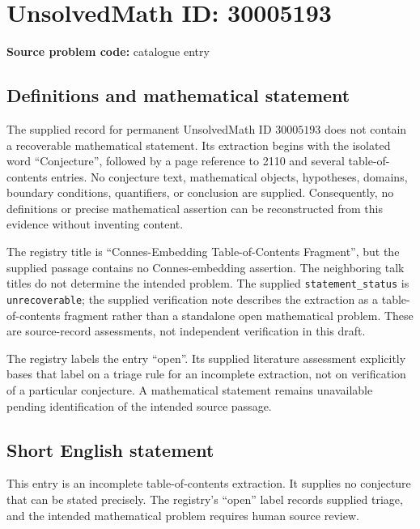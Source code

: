 \documentclass[11pt]{article}
\begin{document}
\section*{UnsolvedMath ID: 30005193}
\textbf{Source problem code:} catalogue entry
\subsection{Definitions and mathematical statement}
The supplied record for permanent UnsolvedMath ID \(30005193\) does not contain a recoverable mathematical statement. Its extraction begins with the isolated word ``Conjecture'', followed by a page reference to 2110 and several table-of-contents entries. No conjecture text, mathematical objects, hypotheses, domains, boundary conditions, quantifiers, or conclusion are supplied. Consequently, no definitions or precise mathematical assertion can be reconstructed from this evidence without inventing content.

The registry title is ``Connes-Embedding Table-of-Contents Fragment'', but the supplied passage contains no Connes-embedding assertion. The neighboring talk titles do not determine the intended problem. The supplied \texttt{statement\_status} is \texttt{unrecoverable}; the supplied verification note describes the extraction as a table-of-contents fragment rather than a standalone open mathematical problem. These are source-record assessments, not independent verification in this draft.

The registry labels the entry ``open''. Its supplied literature assessment explicitly bases that label on a triage rule for an incomplete extraction, not on verification of a particular conjecture. A mathematical statement remains unavailable pending identification of the intended source passage.
\subsection{Short English statement}
This entry is an incomplete table-of-contents extraction. It supplies no conjecture that can be stated precisely. The registry's ``open'' label records supplied triage, and the intended mathematical problem requires human source review.
\end{document}
